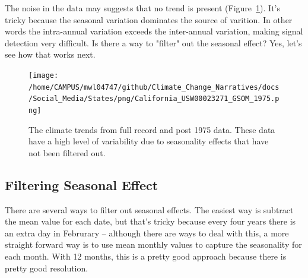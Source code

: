 \documentclass{article}
\begin{document}
\begin{knitrout}
\begin{kframe}
{\ttfamily\noindent\bfseries{}}

{\ttfamily\noindent\bfseries{}}

{\ttfamily\noindent\bfseries{}}

{\ttfamily\noindent\bfseries\color{errorcolor}{\#\# Error in eval(expr, envir, enclos): object 'GSOM' not found}}

{\ttfamily\noindent\bfseries\color{errorcolor}{\#\# Error in text(pred\_dates\$Date[location\_index], ci[location\_index, 3], : object 'pred\_dates' not found}}\end{kframe}
\end{knitrout}

The noise in the data may suggests that no trend is present (Figure~\ref{fig:GSOM-1975trend}). It's tricky because the seasonal variation dominates the source of varition. In other words the intra-annual variation exceeds the inter-annual variation, making signal detection very difficult. Is there a way to "filter" out the seasonal effect? Yes, let's see how that works next. 

\begin{figure}
\texttt{[image: /home/CAMPUS/mwl04747/github/Climate\_Change\_Narratives/docs/Social\_Media/States/png/California\_USW00023271\_GSOM\_1975.png]}
\caption{The climate trends from full record and post 1975 data. These data have a high level of variability due to seasonality effects that have not been filtered out.}
\label{fig:GSOM-1975trend}
\end{figure}


\subsection{Filtering Seasonal Effect}

There are several ways to filter out seasonal effects. The easiest way is subtract the mean value for each date, but that's tricky because every four years there is an extra day in Februrary -- although there are ways to deal with this, a more straight forward way is to use mean monthly values to capture the seasonality for each month. With 12 months, this is a pretty good approach because there is pretty good resolution. 
\end{document}
